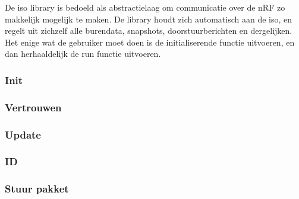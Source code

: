 De iso library is bedoeld als abstractielaag om communicatie over de nRF zo makkelijk mogelijk te maken. De library houdt zich automatisch aan de iso, en regelt uit zichzelf alle burendata, snapshots, doorstuurberichten en dergelijken. 
Het enige wat de gebruiker moet doen is de initialiserende functie uitvoeren, en dan herhaaldelijk de run functie uitvoeren.



\subsubsection{Init}
\subsubsection{Vertrouwen}
\subsubsection{Update}
\subsubsection{ID}
\subsubsection{Stuur pakket}